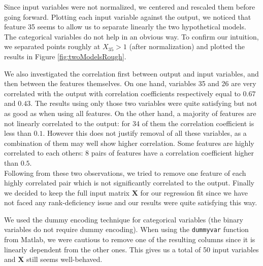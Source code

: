 \documentclass{article} %
\begin{document}
  Since input variables were not normalized, we centered and rescaled them before going forward. Plotting each input variable against the output, we noticed that feature 35 seems to allow us to separate linearly the two hypothetical models. The categorical variables do not help in an obvious way. To confirm our intuition, we separated points roughly at $X_{35} > 1$ (after normalization) and plotted the results in Figure \ref{fig:twoModelsRough}.

  We also investigated the correlation first between output and input variables, and then between the features themselves. On one hand, variables 35 and 26 are very correlated with the output with correlation coefficients respectively equal to $0.67$ and $0.43$. The results using only those two variables were quite satisfying but not as good as when using all features. On the other hand, a majority of features are not linearly correlated to the output: for 34 of them the correlation coefficient is less than $0.1$. However this does not justify removal of all these variables, as a combination of them may well show higher correlation. Some features are highly correlated to each others: 8 pairs of features have a correlation coefficient higher than $0.5$.\\
  Following from these two observations, we tried to remove one feature of each highly correlated pair which is not significantly correlated to the output. Finally we decided to keep the full input matrix $\mathbf{X}$ for our regression fit since we have not faced any rank-deficiency issue and our results were quite satisfying this way.

  We used the dummy encoding technique for categorical variables (the binary variables do not require dummy encoding). When using the \texttt{dummyvar} function from Matlab, we were cautious to remove one of the resulting columns since it is linearly dependent from the other ones. This gives us a total of 50 input variables and $\mathbf{X}$ still seems well-behaved.
\end{document}
